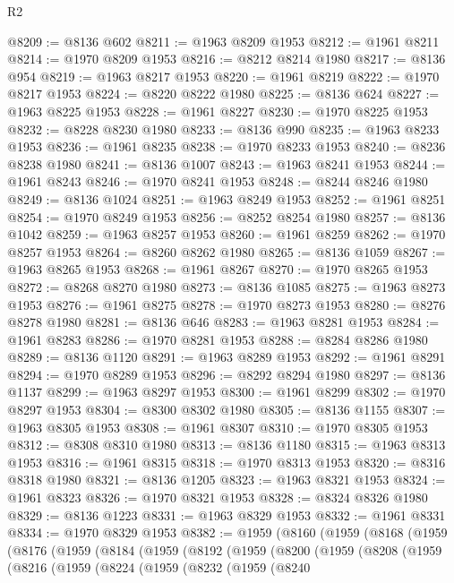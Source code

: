 \begin{lexlean}{R2}
\begin{coremodule}
@8209 := @8136 @602
@8211 := @1963 @8209 @1953
@8212 := @1961 @8211
@8214 := @1970 @8209 @1953
@8216 := @8212 @8214 @1980
@8217 := @8136 @954
@8219 := @1963 @8217 @1953
@8220 := @1961 @8219
@8222 := @1970 @8217 @1953
@8224 := @8220 @8222 @1980
@8225 := @8136 @624
@8227 := @1963 @8225 @1953
@8228 := @1961 @8227
@8230 := @1970 @8225 @1953
@8232 := @8228 @8230 @1980
@8233 := @8136 @990
@8235 := @1963 @8233 @1953
@8236 := @1961 @8235
@8238 := @1970 @8233 @1953
@8240 := @8236 @8238 @1980
@8241 := @8136 @1007
@8243 := @1963 @8241 @1953
@8244 := @1961 @8243
@8246 := @1970 @8241 @1953
@8248 := @8244 @8246 @1980
@8249 := @8136 @1024
@8251 := @1963 @8249 @1953
@8252 := @1961 @8251
@8254 := @1970 @8249 @1953
@8256 := @8252 @8254 @1980
@8257 := @8136 @1042
@8259 := @1963 @8257 @1953
@8260 := @1961 @8259
@8262 := @1970 @8257 @1953
@8264 := @8260 @8262 @1980
@8265 := @8136 @1059
@8267 := @1963 @8265 @1953
@8268 := @1961 @8267
@8270 := @1970 @8265 @1953
@8272 := @8268 @8270 @1980
@8273 := @8136 @1085
@8275 := @1963 @8273 @1953
@8276 := @1961 @8275
@8278 := @1970 @8273 @1953
@8280 := @8276 @8278 @1980
@8281 := @8136 @646
@8283 := @1963 @8281 @1953
@8284 := @1961 @8283
@8286 := @1970 @8281 @1953
@8288 := @8284 @8286 @1980
@8289 := @8136 @1120
@8291 := @1963 @8289 @1953
@8292 := @1961 @8291
@8294 := @1970 @8289 @1953
@8296 := @8292 @8294 @1980
@8297 := @8136 @1137
@8299 := @1963 @8297 @1953
@8300 := @1961 @8299
@8302 := @1970 @8297 @1953
@8304 := @8300 @8302 @1980
@8305 := @8136 @1155
@8307 := @1963 @8305 @1953
@8308 := @1961 @8307
@8310 := @1970 @8305 @1953
@8312 := @8308 @8310 @1980
@8313 := @8136 @1180
@8315 := @1963 @8313 @1953
@8316 := @1961 @8315
@8318 := @1970 @8313 @1953
@8320 := @8316 @8318 @1980
@8321 := @8136 @1205
@8323 := @1963 @8321 @1953
@8324 := @1961 @8323
@8326 := @1970 @8321 @1953
@8328 := @8324 @8326 @1980
@8329 := @8136 @1223
@8331 := @1963 @8329 @1953
@8332 := @1961 @8331
@8334 := @1970 @8329 @1953
@8382 := @1959
    (@8160
      (@1959
        (@8168
          (@1959
            (@8176
              (@1959
                (@8184
                  (@1959
                    (@8192
                      (@1959
                        (@8200
                          (@1959
                            (@8208
                              (@1959
                                (@8216
                                  (@1959
                                    (@8224
                                      (@1959
                                        (@8232
                                          (@1959
                                            (@8240

\end{coremodule}
\end{lexlean}
